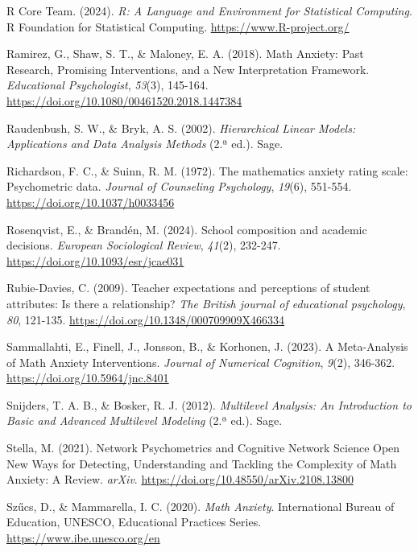 \documentclass[
  spanish,
  a4paper,
  oneside]{scrbook}
\newlength{\cslhangindent}
\newenvironment{CSLReferences}[2] %
 {\begin{list}{}{%
  \setlength{\itemindent}{0pt}
  \setlength{\leftmargin}{0pt}
  \setlength{\parsep}{0pt}
  \ifodd #1
   \setlength{\leftmargin}{\cslhangindent}
   \setlength{\itemindent}{-1\cslhangindent}
  \fi
  \setlength{\itemsep}{#2\baselineskip}}}
 {\end{list}}
\begin{document}
\begin{CSLReferences}{1}{0}
R Core Team. (2024). \emph{R: A Language and Environment for Statistical
Computing}. R Foundation for Statistical Computing.
\url{https://www.R-project.org/}

Ramirez, G., Shaw, S. T., \& Maloney, E. A. (2018). Math Anxiety: Past
Research, Promising Interventions, and a New Interpretation Framework.
\emph{Educational Psychologist}, \emph{53}(3), 145-164.
\url{https://doi.org/10.1080/00461520.2018.1447384}

Raudenbush, S. W., \& Bryk, A. S. (2002). \emph{Hierarchical Linear
Models: Applications and Data Analysis Methods} (2.ª ed.). Sage.

Richardson, F. C., \& Suinn, R. M. (1972). The mathematics anxiety
rating scale: Psychometric data. \emph{Journal of Counseling
Psychology}, \emph{19}(6), 551-554.
\url{https://doi.org/10.1037/h0033456}

Rosenqvist, E., \& Brandén, M. (2024). School composition and academic
decisions. \emph{European Sociological Review}, \emph{41}(2), 232-247.
\url{https://doi.org/10.1093/esr/jcae031}

Rubie-Davies, C. (2009). Teacher expectations and perceptions of student
attributes: Is there a relationship? \emph{The British journal of
educational psychology}, \emph{80}, 121-135.
\url{https://doi.org/10.1348/000709909X466334}

Sammallahti, E., Finell, J., Jonsson, B., \& Korhonen, J. (2023). A
Meta-Analysis of Math Anxiety Interventions. \emph{Journal of Numerical
Cognition}, \emph{9}(2), 346-362. \url{https://doi.org/10.5964/jnc.8401}

Snijders, T. A. B., \& Bosker, R. J. (2012). \emph{Multilevel Analysis:
An Introduction to Basic and Advanced Multilevel Modeling} (2.ª ed.).
Sage.

Stella, M. (2021). Network Psychometrics and Cognitive Network Science
Open New Ways for Detecting, Understanding and Tackling the Complexity
of Math Anxiety: A Review. \emph{arXiv}.
\url{https://doi.org/10.48550/arXiv.2108.13800}

Szűcs, D., \& Mammarella, I. C. (2020). \emph{Math Anxiety}.
International Bureau of Education, UNESCO, Educational Practices Series.
\url{https://www.ibe.unesco.org/en}


\end{CSLReferences}
\end{document}
